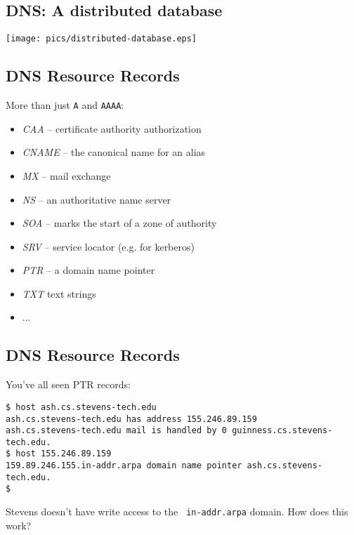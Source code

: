\documentclass[xga]{xdvislides}
\begin{document}
\subsection{DNS: A distributed database}
\vspace*{\fill}
\begin{center}
	\texttt{[image: pics/distributed-database.eps]}
\end{center}
\vspace*{\fill}


\subsection{DNS Resource Records}
More than just {\tt A} and {\tt AAAA}:
\begin{itemize}
	\item {\em CAA} -- certificate authority authorization
	\item {\em CNAME} -- the canonical name for an alias
	\item {\em MX} -- mail exchange
	\item {\em NS} -- an authoritative name server
	\item {\em SOA} -- marks the start of a zone of authority
	\item {\em SRV} -- service locator (e.g. for kerberos)
	\item {\em PTR} -- a domain name pointer
	\item {\em TXT} text strings
	\item ...
\end{itemize}

\subsection{DNS Resource Records}
You've all seen PTR records:
\\

\begin{verbatim}
$ host ash.cs.stevens-tech.edu
ash.cs.stevens-tech.edu has address 155.246.89.159
ash.cs.stevens-tech.edu mail is handled by 0 guinness.cs.stevens-tech.edu.
$ host 155.246.89.159
159.89.246.155.in-addr.arpa domain name pointer ash.cs.stevens-tech.edu.
$ 
\end{verbatim}

Stevens doesn't have write access to the {\tt
in-addr.arpa} domain.  How does this work?
 
\end{document}
